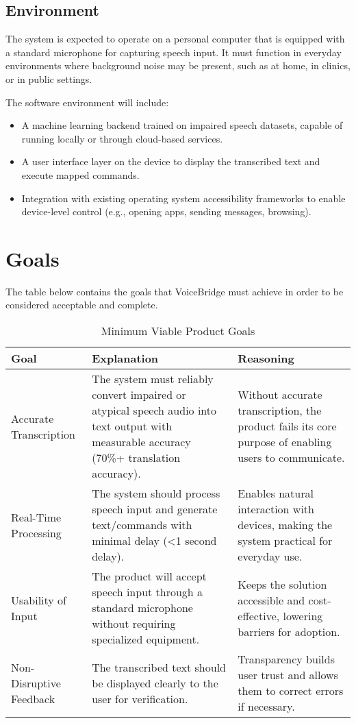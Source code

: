 \documentclass{article}
\begin{document}
\subsection{Environment}
The system is expected to operate on a personal computer that is equipped with a standard microphone for capturing speech input. It must function in everyday environments where background noise may be present, such as at home, in clinics, or in public settings.

The software environment will include:
\begin{itemize}
  \item A machine learning backend trained on impaired speech datasets, capable of running locally or through cloud-based services.
  \item A user interface layer on the device to display the transcribed text and execute mapped commands.
  \item Integration with existing operating system accessibility frameworks to enable device-level control (e.g., opening apps, sending messages, browsing).
\end{itemize}


\section{Goals}
The table below contains the goals that VoiceBridge must achieve in order to be considered acceptable and complete.

\begin{table}[hp]
\caption{Minimum Viable Product Goals} 
\begin{tabularx}{\textwidth}{lXX} \\[-8pt]
\toprule
\textbf{Goal} & \textbf{Explanation} & \textbf{Reasoning}\\
\midrule
Accurate Transcription & The system must reliably convert impaired or atypical speech audio into text output with measurable accuracy (70\%+ translation accuracy). & Without accurate transcription, the product fails its core purpose of enabling users to communicate.\\
Real-Time Processing & The system should process speech input and generate text/commands with minimal delay (\textless1 second delay). & Enables natural interaction with devices, making the system practical for everyday use.\\
Usability of Input & The product will accept speech input through a standard microphone without requiring specialized equipment. & Keeps the solution accessible and cost-effective, lowering barriers for adoption.\\
Non-Disruptive Feedback & The transcribed text should be displayed clearly to the user for verification. & Transparency builds user trust and allows them to correct errors if necessary.\\
\bottomrule
\end{tabularx}
\end{table}
\end{document}
